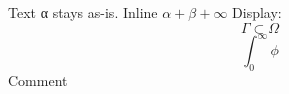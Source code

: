 \documentclass{article}
\begin{document}
Text α stays as-is.
Inline $ α + β + ∞ $
Display:
\[
Γ ⊂ Ω
\]
\begin{equation}
∫_0^∞ ϕ
\end{equation}
Comment %
\end{document}
